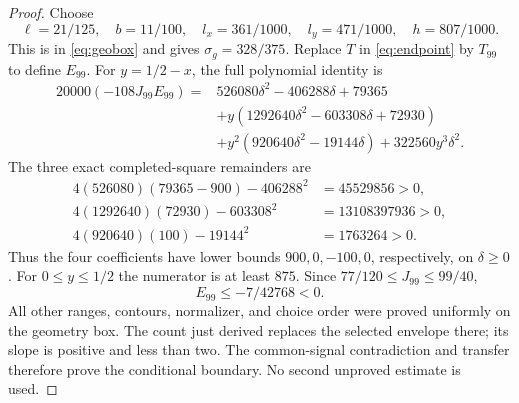 \begin{proof}
Choose
\[
 \ell=21/125,\quad b=11/100,\quad
 l_x=361/1000,\quad l_y=471/1000,\quad h=807/1000.
\]
This is in \eqref{eq:geobox} and gives $\sigma_g=328/375$. Replace $T$ in \eqref{eq:endpoint} by $T_{99}$ to define $E_{99}$. For $y=1/2-x$, the full polynomial identity is
\begin{align*}
 20000(-108J_{99}E_{99})={}&526080\delta^2-406288\delta+79365\\
 &+y(1292640\delta^2-603308\delta+72930)\\
 &+y^2(920640\delta^2-19144\delta)+322560y^3\delta^2.
\end{align*}
The three exact completed-square remainders are
\begin{align*}
 4(526080)(79365-900)-406288^2&=45529856>0,\\
 4(1292640)(72930)-603308^2&=13108397936>0,\\
 4(920640)(100)-19144^2&=1763264>0.
\end{align*}
Thus the four coefficients have lower bounds $900,0,-100,0$, respectively, on $\delta\ge0$. For $0\le y\le1/2$ the numerator is at least $875$. Since $77/120\le J_{99}\le99/40$,
\[
 E_{99}\le-7/42768<0.
\]
All other ranges, contours, normalizer, and choice order were proved uniformly on the geometry box. The count just derived replaces the selected envelope there; its slope is positive and less than two. The common-signal contradiction and transfer therefore prove the conditional boundary. No second unproved estimate is used.
\end{proof}
